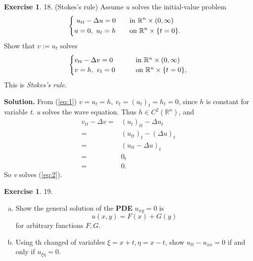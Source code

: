 \documentclass[a4paper]{book}
\newenvironment{solution}%
{\noindent\textbf{Solution.}}%
{\qedhere}
\numberwithin{equation}{chapter}
\theoremstyle{definition}
\newtheorem{exc}[exm]{Exercise}
\begin{document}
\begin{multicols}{2}
  \setlength{\columnseprule}{0.2pt}

  \begin{exc}
    18.  (Stokes's rule) Assume $ u $ solves the initial-value problem
    \begin{equation}\label{eq:1}
    \begin{cases}
      \begin{aligned}
        u_{tt} - \Delta u = 0 \qquad &\textmd{in} \ \mathbb{R}^n \times (0, \infty) \\
        u = 0, \ u_t = h \qquad     &\textmd{on} \ \mathbb{R}^n \times \{t = 0\}.
      \end{aligned}
    \end{cases}
  \end{equation}
  Show that $v := u_t $ solves
  \begin{align}\label{eq:2}
    \begin{cases}
      v_{tt} - \Delta v = 0  \qquad & \textmd{in} \ \mathbb{R}^n \times (0, \infty)  \\
      v = h, \ v_t = 0 \qquad      & \textmd{on} \ \mathbb{R}^n \times \{t = 0\},
    \end{cases}
  \end{align}
  This is \textit{Stokes's rule}.
\end{exc}

\begin{solution}
  From (\ref{eq:1}) $v = u_t = h, \ v_t = {(u_t)}_t = h_t = 0$, since $h$ is constant for variable \textit{t}. \textit{u} solves the wave equation. Thus $h \in C^2(\mathbb{R}^n)$, and
  \begin{align*}
    v_{tt} - \Delta v =& {(u_t)}_{tt} - \Delta u_t \\
    =& {(u_{tt})}_t - {(\Delta u)}_t \\
    =& {(u_{tt} - \Delta u)}_t \\
    =& 0_t \\
    =& 0.
  \end{align*}
  So \textit{v} solves (\ref{eq:2}).
\end{solution}



\begin{exc}
  19.  
  \begin{enumerate} [(a)]
  \item Show the general solution of the \textbf{PDE} $u_{xy} = 0$ is
    \begin{equation*}
      u(x,y) = F(x) + G(y)
    \end{equation*}
    for arbitrary functions $F,G$.
  \item Using th changed of variables $\xi = x + t, \eta = x - t$, show $u_{tt} - u_{xx} = 0$ if and only if $u_{\xi \eta} = 0$.


\end{enumerate}
\end{exc}
\end{multicols}
\end{document}
